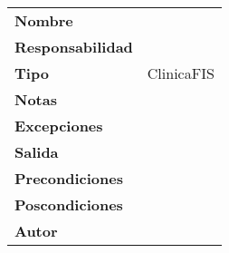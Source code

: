 \begin{table}[H]
\centering
\label{my-label}
\begin{tabularx}{\textwidth}{l|X}
\textbf{Nombre}          & \\
\textbf{Responsabilidad} & \\
\textbf{Tipo}            & ClinicaFIS \\
\textbf{Notas}           &  \\
\textbf{Excepciones}     &  \\
\textbf{Salida}          &  \\
\textbf{Precondiciones}  &  \\
\textbf{Poscondiciones}  &  \\
\textbf{Autor}			 &
\end{tabularx}
\end{table}